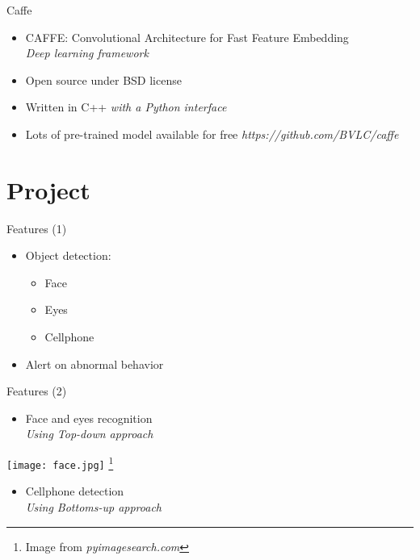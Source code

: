 \documentclass{beamer}
\begin{document}
\begin{frame}{Caffe}
    \begin{itemize}
        \item CAFFE: Convolutional Architecture for Fast Feature Embedding  \\
            \hspace{0.27cm}\textit{Deep learning framework}
        \item Open source under BSD license
        \item Written in C++
            \hspace{0.27cm}\textit{with a Python interface}
        \item Lots of pre-trained model available for free
            \hspace{0.27cm}\textit{https://github.com/BVLC/caffe}
    \end{itemize}
\end{frame}

\section{Project}
\begin{frame}{Features (1)}
    \begin{itemize}
        \item Object detection:
            \begin{itemize}
                \item Face
                \item Eyes
                \item Cellphone
            \end{itemize}
        \item Alert on abnormal behavior
    \end{itemize}
\end{frame}

\begin{frame}{Features (2)}
    \begin{itemize}
        \item Face and eyes recognition \\
            \hspace{0.27cm}\textit{Using Top-down approach}
    \end{itemize}
            \begin{center}
                \texttt{[image: face.jpg]}
                \let\thefootnote\relax\footnote{Image from \textit{pyimagesearch.com}}
            \end{center}
    \begin{itemize}
        \item Cellphone detection \\
            \hspace{0.27cm}\textit{Using Bottoms-up approach}
    \end{itemize}
\end{frame}
\end{document}
